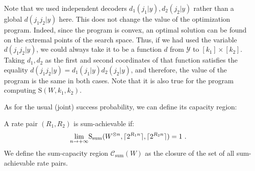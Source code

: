 Note that we used independent decoders $d_1(j_1|y),d_2(j_2|y)$ rather than a global $d(j_1j_2|y)$ here. This does not change the value of the optimization program. Indeed, since the program is convex, an optimal solution can be found on the extremal points of the search space. Thus, if we had used the variable $d(j_1j_2|y)$, we could always take it to be a function $d$ from $\mathcal{Y}$ to $[k_1]\times[k_2]$. Taking $d_1,d_2$ as the first and second coordinates of that function satisfies the equality $d(j_1j_2|y) = d_1(j_1|y)d_2(j_2|y)$, and therefore, the value of the program is the same in both cases. Note that it is also true for the program computing $\mathrm{S}(W,k_1,k_2)$.

As for the usual (joint) success probability, we can define its capacity region:

\begin{definition}
  A rate pair $(R_1,R_2)$ is sum-achievable if:
  \[ \underset{n \rightarrow +\infty}{\lim} \mathrm{S}_{\text{sum}}(W^{\otimes n},\lceil2^{R_1n}\rceil,\lceil2^{R_2n}\rceil) = 1 \ . \]
  We define the sum-capacity region $\mathcal{C}_{\text{sum}}(W)$ as the closure of the set of all sum-achievable rate pairs.
\end{definition}

